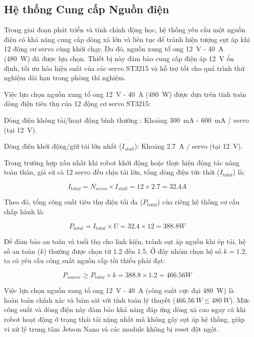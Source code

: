 \subsection{Hệ thống Cung cấp Nguồn điện}

Trong giai đoạn phát triển và tinh chỉnh động học, hệ thống yêu cầu một nguồn điện có khả năng cung cấp dòng xả lớn và liên tục để tránh hiện tượng sụt áp khi 12 động cơ servo cùng khởi chạy. Do đó, nguồn xung tổ ong 12~V - 40~A (480~W) đã được lựa chọn. Thiết bị này đảm bảo cung cấp điện áp 12~V ổn định, tối ưu hóa hiệu suất của các servo ST3215 và hỗ trợ tốt cho quá trình thử nghiệm dài hạn trong phòng thí nghiệm.

Việc lựa chọn nguồn xung tổ ong 12~V - 40~A (480~W) được dựa trên tính toán dòng điện tiêu thụ của 12 động cơ servo ST3215:

Dòng điện không tải/hoạt động bình thường : Khoảng 300~mA - 600~mA / servo (tại 12~V).
    
Dòng điện khởi động/giữ tải lớn nhất ($I_{stall}$): Khoảng 2.7~A / servo (tại 12~V).

Trong trường hợp xấu nhất khi robot khởi động hoặc thực hiện động tác nâng toàn thân, giả sử cả 12 servo đều chịu tải lớn, tổng dòng điện tức thời ($I_{total}$) là:

$$I_{total} = N_{servo} \times I_{stall} = 12 \times 2.7 = 32.4A$$

Theo đó, tổng công suất tiêu thụ điện tối đa ($P_{total}$) của riêng hệ thống cơ cấu chấp hành là:

$$P_{total} = I_{total} \times U = 32.4 \times 12 = 388.8W$$

Để đảm bảo an toàn và tuổi thọ cho linh kiện, tránh sụt áp nguồn khi ép tải, hệ số an toàn ($k$) thường được chọn từ 1.2 đến 1.5. Ở đây nhóm chọn hệ số $k = 1.2$, ta có yêu cầu công suất nguồn cấp tối thiểu phải đạt:

$$P_{source} \ge P_{total} \times k = 388.8 \times 1.2 = 466.56W$$

Việc lựa chọn nguồn xung tổ ong 12~V - 40~A (công suất cực đại 480~W) là hoàn toàn chính xác và bám sát với tính toán lý thuyết ($466.56~W \le 480~W$). Mức công suất và dòng điện này đảm bảo khả năng đáp ứng dòng xả cao ngay cả khi robot hoạt động ở trạng thái tải nặng nhất mà không gây sụt áp hệ thống, giúp vi xử lý trung tâm Jetson Nano và các module không bị reset đột ngột.

